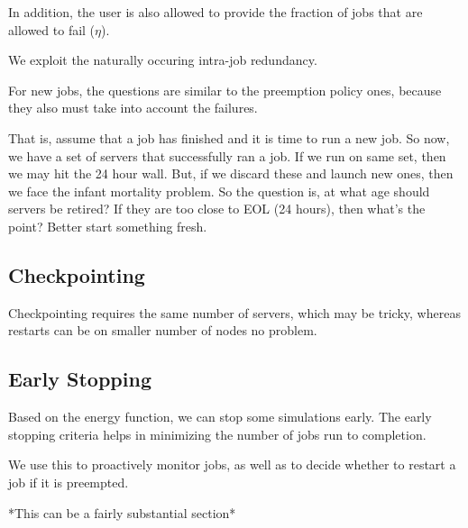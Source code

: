In addition, the user is also allowed to provide the fraction of jobs that are allowed to fail ($\eta$).

We exploit the naturally occuring intra-job redundancy. 

For new jobs, the questions are similar to the preemption policy ones, because they also must take into account the failures.

That is, assume that a job has finished and it is time to run a new job. So now, we have a set of servers that successfully ran a job. If we run on same set, then we may hit the 24 hour wall. But, if we discard these and launch new ones, then we face the infant mortality problem. So the question is, at what age should servers be retired? If they are too close to EOL (24 hours), then what's the point? Better start something fresh.



\subsection{Checkpointing}

Checkpointing requires the same number of servers, which may be tricky, whereas restarts can be on smaller number of nodes no problem.


\subsection{Early Stopping}

Based on the energy function, we can stop some simulations early.
The early stopping criteria helps in minimizing the number of jobs run to completion.

We use this to proactively monitor jobs, as well as to decide whether to restart a job if it is preempted.

*This can be a fairly substantial section*



